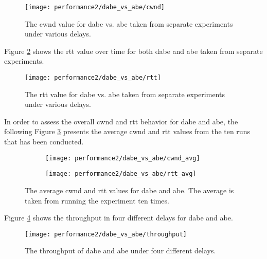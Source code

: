 \begin{figure}[H]
    \centering
    \texttt{[image: performance2/dabe\_vs\_abe/cwnd]}
    \captionsetup{width=1.0\linewidth}
    \caption{The \gls{cwnd} value for \gls{dabe} vs. \gls{abe} taken from separate experiments under various delays.}
    \label{fig:dabe_vs_abe_cwnd}
\end{figure}

Figure \ref{fig:dabe_vs_abe_rtt} shows the \gls{rtt} value over time for both \gls{dabe} and \gls{abe} taken from separate experiments.

\begin{figure}[H]
    \centering
    \texttt{[image: performance2/dabe\_vs\_abe/rtt]}
    \captionsetup{width=1.0\linewidth}
    \caption{The \gls{rtt} value for \gls{dabe} vs. \gls{abe} taken from separate experiments under various delays.}
    \label{fig:dabe_vs_abe_rtt}
\end{figure}

In order to assess the overall \gls{cwnd} and \gls{rtt} behavior for \gls{dabe} and \gls{abe}, the following Figure \ref{fig:dabe_vs_abe_avg} presents the average \gls{cwnd} and \gls{rtt} values from the ten runs that has been conducted.

\begin{figure}[H]
    \centering
    \begin{subfigure}{0.5\linewidth}
        \centering
        \texttt{[image: performance2/dabe\_vs\_abe/cwnd\_avg]}
    \end{subfigure}%
    \begin{subfigure}{0.5\linewidth}
        \centering
        \texttt{[image: performance2/dabe\_vs\_abe/rtt\_avg]}
    \end{subfigure}
    \caption{The average \gls{cwnd} and \gls{rtt} values for \gls{dabe} and \gls{abe}. The average is taken from running the experiment ten times.}
    \label{fig:dabe_vs_abe_avg}
\end{figure}

Figure \ref{fig:dabe_vs_abe_throughput} shows the throughput in four different delays for \gls{dabe} and \gls{abe}.

\begin{figure}[H]
    \centering
    \texttt{[image: performance2/dabe\_vs\_abe/throughput]}
    \captionsetup{width=0.9\linewidth}
    \caption{The throughput of \gls{dabe} and \gls{abe} under four different delays.}
    \label{fig:dabe_vs_abe_throughput}
\end{figure}









